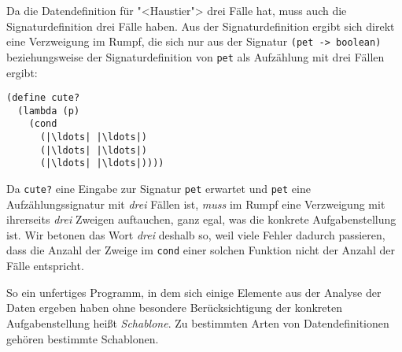Da die Datendefinition für "<Haustier"> drei Fälle hat, muss auch die
Signaturdefinition drei Fälle haben.  Aus der Signaturdefinition
ergibt sich direkt eine Verzweigung im Rumpf, die sich nur aus der
Signatur \lstinline{(pet -> boolean)} beziehungsweise der
Signaturdefinition von \lstinline{pet} als Aufzählung mit drei Fällen
ergibt:
%
\begin{lstlisting}
(define cute?
  (lambda (p)
    (cond
      (|\ldots| |\ldots|)
      (|\ldots| |\ldots|)
      (|\ldots| |\ldots|))))
\end{lstlisting}
%
Da \lstinline{cute?} eine Eingabe zur Signatur \lstinline{pet} erwartet und
\lstinline{pet} eine Aufzählungssignatur mit \emph{drei} Fällen ist, \emph{muss}
im Rumpf eine Verzweigung mit ihrerseits \emph{drei} Zweigen
auftauchen, ganz egal, was die konkrete Aufgabenstellung ist.  Wir
betonen das Wort \emph{drei} deshalb so, weil viele Fehler dadurch
passieren, dass die Anzahl der Zweige im \lstinline{cond} einer solchen
Funktion nicht der Anzahl der Fälle entspricht.

So ein unfertiges Programm, in dem sich einige Elemente aus der
Analyse der Daten ergeben haben ohne besondere Berücksichtigung der
konkreten Aufgabenstellung heißt \textit{Schablone}.  Zu bestimmten
Arten von Datendefinitionen gehören bestimmte Schablonen.

